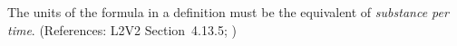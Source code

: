 The units of the  formula in a \KineticLaw definition must be
the equivalent of \emph{substance per time}.  (References: L2V2
Section~4.13.5; )

